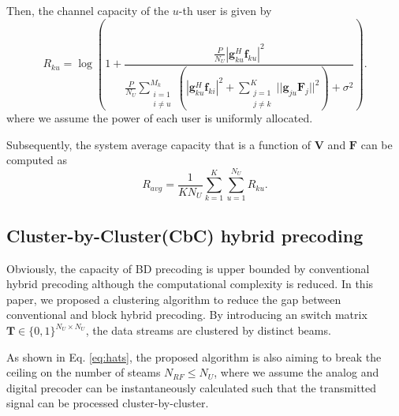 \documentclass[conference]{IEEEtran}
\begin{document}
Then, the channel capacity of the $u$-th user is given by
\begin{equation}\label{eq:convenR}
R_{ku} = \log\left(1+\frac{\frac{P}{N_U}|{\bm{g}}_{ku}^H \bm{f}_{ku}|^2}{\frac{P}{N_U}\displaystyle\sum_{\substack{i=1 \\ i\neq u}}^{M_k}(|{\bm{g}}_{ku}^H\bm{f}_{ki}|^2+\sum_{\substack{j=1\\j\neq k}}^{K}||\bm{g}_{ju}\bm{F}_j||^2)+\sigma^2}\right).
\end{equation}
where we assume the power of each user is uniformly allocated.

Subsequently, the system average capacity that is a function of ${\bm V}$ and ${\bm F}$ can be computed as
\begin{equation}
R_{avg}=\frac{1}{KN_U}\sum_{k=1}^{K}\sum_{u=1}^{N_U}R_{ku}.
\end{equation}

\subsection{Cluster-by-Cluster(CbC) hybrid precoding}
Obviously, the capacity of BD precoding is upper bounded by conventional hybrid precoding although the computational complexity is reduced. In this paper, we proposed a clustering algorithm to reduce the gap between conventional and block hybrid precoding. By introducing an switch matrix $\bm{T}\in \{0,1\}^{N_U\times N_U}$, the data streams are clustered by distinct beams.

As shown in Eq. \eqref{eq:hats}, the proposed algorithm is also aiming to break the ceiling on the number of steams $N_{RF}\leq N_U$, where we assume the analog and digital precoder can be instantaneously calculated such that the transmitted signal can be processed cluster-by-cluster.
\end{document}
